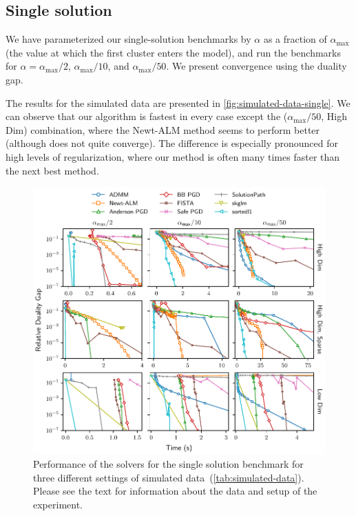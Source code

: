 \documentclass[article]{jss}
\makeatletter
\let\natwidth\Gin@nat@width
\makeatother
\begin{document}
\subsection{Single solution}\label{sec:single-solution-benchmark}

We have parameterized our single-solution benchmarks by \(\alpha\) as a
fraction of \(\alpha_\text{max}\) (the value at which the first cluster enters
the model), and run the benchmarks for \(\alpha = \alpha_\text{max}/2\),
\(\alpha_\text{max}/10\), and \(\alpha_\text{max}/50\). We present convergence using
the duality gap.

The results for the simulated data are presented in \autoref{fig:simulated-data-single}.
We can observe that our algorithm is fastest in every case except
the (\(\alpha_\text{max}/50\), High Dim) combination, where the Newt-ALM
method seems to perform better (although does not quite converge). The difference
is especially pronounced for high levels of regularization, where our method is
often many times faster than the next best method.

\begin{figure}[tp]
  \centering
  \includegraphics[width=\natwidth]{images/benchmark_single_simulated.pdf}
  \caption{%
    Performance of the solvers for the single solution benchmark for three different settings
    of simulated data~(\autoref{tab:simulated-data}).
    Please see the text for information about the data and setup of the experiment.
  }
  \label{fig:simulated-data-single}
\end{figure}
\end{document}
